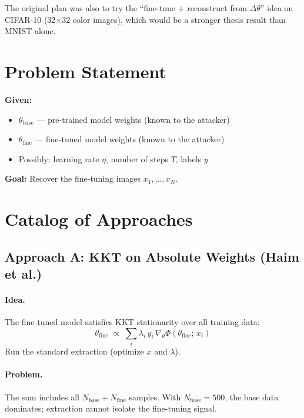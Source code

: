 \documentclass[11pt,a4paper]{article}
\begin{document}
The original plan was also to try the ``fine-tune + reconstruct from $\Delta\theta$'' idea on CIFAR-10 (32$\times$32 color images), which would be a stronger thesis result than MNIST alone.

\section{Problem Statement}

\textbf{Given:}
\begin{itemize}
  \item $\theta_{\mathrm{base}}$ — pre-trained model weights (known to the attacker)
  \item $\theta_{\mathrm{fine}}$ — fine-tuned model weights (known to the attacker)
  \item Possibly: learning rate $\eta$, number of steps $T$, labels $y$
\end{itemize}

\textbf{Goal:} Recover the fine-tuning images $x_1, \dots, x_N$.

\section{Catalog of Approaches}

\subsection{Approach A: KKT on Absolute Weights (Haim et al.)}

\paragraph{Idea.} The fine-tuned model satisfies KKT stationarity over all training data:
\[
  \theta_{\mathrm{fine}} \;\propto\; \sum_i \lambda_i \, y_i \,\nabla_\theta \Phi(\theta_{\mathrm{fine}};\, x_i)
\]
Run the standard extraction (optimize $x$ and $\lambda$).

\paragraph{Problem.} The sum includes all $N_{\mathrm{base}} + N_{\mathrm{fine}}$ samples. With $N_{\mathrm{base}}=500$, the base data dominates; extraction cannot isolate the fine-tuning signal.
\end{document}
